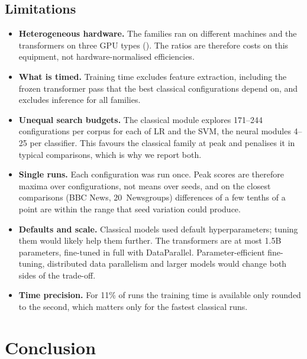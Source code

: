 \documentclass{ijis}
\begin{document}
\subsection{Limitations}

\begin{itemize}
\setlength\itemsep{1pt}
\item \textbf{Heterogeneous hardware.} The families ran on different machines and the transformers on three GPU types (). The ratios are therefore costs on this equipment, not hardware-normalised efficiencies.
\item \textbf{What is timed.} Training time excludes feature extraction, including the frozen transformer pass that the best classical configurations depend on, and excludes inference for all families.
\item \textbf{Unequal search budgets.} The classical module explores 171--244 configurations per corpus for each of LR and the SVM, the neural modules 4--25 per classifier. This favours the classical family at peak and penalises it in typical comparisons, which is why we report both.
\item \textbf{Single runs.} Each configuration was run once. Peak scores are therefore maxima over configurations, not means over seeds, and on the closest comparisons (BBC News, 20~Newsgroups) differences of a few tenths of a point are within the range that seed variation could produce.
\item \textbf{Defaults and scale.} Classical models used default hyperparameters; tuning them would likely help them further. The transformers are at most 1.5B parameters, fine-tuned in full with DataParallel. Parameter-efficient fine-tuning, distributed data parallelism and larger models would change both sides of the trade-off.
\item \textbf{Time precision.} For 11\% of runs the training time is available only rounded to the second, which matters only for the fastest classical runs.
\end{itemize}

\section{Conclusion}\label{sec:conclusion}
\end{document}
